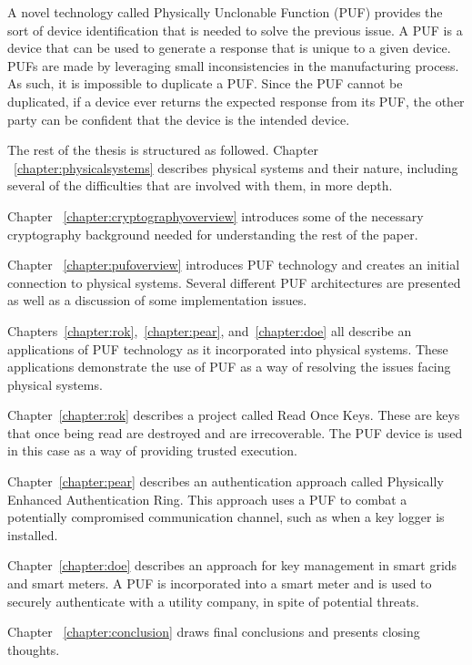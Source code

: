A novel technology called Physically Unclonable Function (PUF) provides the sort of device identification that is needed
to solve the previous issue. A PUF is a device that can be used to generate a response that is unique to a given device.
PUFs are made by leveraging small inconsistencies in the manufacturing process. As such, it is impossible to
duplicate a PUF. Since the PUF cannot be duplicated, if a device ever returns the expected response from its PUF,
the other party can be confident that the device is the intended device.

The rest of the thesis is structured as followed. 
Chapter ~\ref{chapter:physicalsystems} describes physical systems and their nature, including several of the difficulties that are involved with them, in more depth. 

Chapter ~\ref{chapter:cryptographyoverview} introduces some of the necessary cryptography background needed for
understanding the rest of the paper.

Chapter ~\ref{chapter:pufoverview} introduces PUF technology and creates an initial connection to physical systems. 
Several different PUF architectures are presented as well as a discussion of some implementation issues.

Chapters~\ref{chapter:rok},~\ref{chapter:pear}, and~\ref{chapter:doe} all describe an applications of PUF 
technology as it incorporated into physical systems. These applications demonstrate the use of PUF as a way of 
resolving the issues facing physical systems. 

Chapter~\ref{chapter:rok} describes a project called Read Once Keys. These are keys that once being read are
destroyed and are irrecoverable. The PUF device is used in this case as a way of providing trusted execution.

Chapter~\ref{chapter:pear} describes an authentication approach called Physically Enhanced Authentication Ring. 
This approach uses
a PUF to combat a potentially compromised communication channel, such as when a key logger is installed.

Chapter~\ref{chapter:doe} describes an approach for key management in smart grids and smart meters. A PUF is 
incorporated
into a smart meter and is used to securely authenticate with a utility company, in spite of potential threats.

Chapter ~\ref{chapter:conclusion} draws final conclusions and presents closing thoughts.
